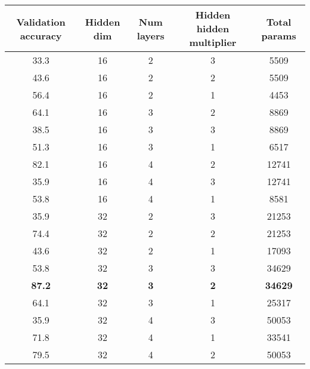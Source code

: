 \begin{table}[t]
    \begin{center}
        \begin{tabular}{ccccc}
        \toprule
        \textbf{Validation accuracy} & \textbf{Hidden dim} & \textbf{Num layers} & \textbf{Hidden hidden multiplier} & \textbf{Total params} \\
        \midrule
        33.3 &         16 &                        2 &          3 &        5509 \\
        43.6 &         16 &                        2 &          2 &        5509 \\
        56.4 &         16 &                        2 &          1 &        4453 \\
        64.1 &         16 &                        3 &          2 &        8869 \\
        38.5 &         16 &                        3 &          3 &        8869 \\
        51.3 &         16 &                        3 &          1 &        6517 \\
        82.1 &         16 &                        4 &          2 &       12741 \\
        35.9 &         16 &                        4 &          3 &       12741 \\
        53.8 &         16 &                        4 &          1 &        8581 \\
        35.9 &         32 &                        2 &          3 &       21253 \\
        74.4 &         32 &                        2 &          2 &       21253 \\
        43.6 &         32 &                        2 &          1 &       17093 \\
        53.8 &         32 &                        3 &          3 &       34629 \\
        \textbf{87.2} &         \textbf{32} & \textbf{3} & \textbf{2} & \textbf{34629} \\
        64.1 &         32 &                        3 &          1 &       25317 \\
        35.9 &         32 &                        4 &          3 &       50053 \\
        71.8 &         32 &                        4 &          1 &       33541 \\
        79.5 &         32 &                        4 &          2 &       50053 \\

\end{tabular}
\end{center}
\end{table}

